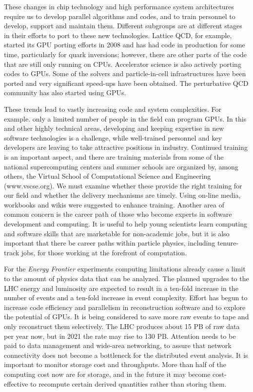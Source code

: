 These changes in chip technology and high performance system architectures
require us to develop parallel algorithms and codes, and to train personnel
to develop, support and maintain them. Different subgroups are at different
stages in their efforts to port to these new technologies. Lattice QCD, for
example, started its GPU porting efforts in 2008 and has had code in
production for some time, particularly for quark inversions; however, there
are other parts of the code that are still only running on CPUs.
Accelerator science is also actively porting codes to GPUs. Some of the
solvers and particle-in-cell infrastructures have been ported and very
significant speed-ups have been obtained. The perturbative QCD community
has also started using GPUs.

These trends lead to vastly increasing code and system complexities. For
example. only a limited number of people in the field can program GPUs. In
this and other highly technical areas, developing and keeping expertise in
new software technologies is a challenge, while well-trained personnel and
key developers are leaving to take attractive positions in industry.
Continued training is an important aspect, and there are training materials
from some of the national supercomputing centers and summer schools are
organized by, among others, the Virtual School of Computational Science and
Engineering (www.vscse.org). We must examine whether these provide the
right training for our field and whether the delivery mechanisms are
timely. Using on-line media, workbooks and wikis were suggested to enhance
training. Another area of common concern is the career path of those who
become experts in software development and computing. It is useful to help
young scientists learn computing and software skills that are marketable
for non-academic jobs, but it is also important that there be career paths
within particle physics, including tenure-track jobs, for those working at
the forefront of computation.

For the {\it Energy Frontier} experiments computing limitations already
cause a limit to the amount of physics data that can be analyzed. The
planned upgrades to the LHC energy and luminosity are expected to result in
a ten-fold increase in the number of events and a ten-fold increase in
event complexity. Effort has begun to increase code efficiency and
parallelism in reconstruction software and to explore the potential of
GPUs. It is being considered to save more raw events to tape and only
reconstruct them selectively. The LHC produces about 15 PB of raw data per
year now, but in 2021 the rate may rise to 130 PB. Attention needs to be
paid to data management and wide-area networking, to assure that network
connectivity does not become a bottleneck for the distributed event
analysis. It is important to monitor storage cost and throughputs. More
than half of the computing cost now are for storage, and in the future it
may become cost-effective to recompute certain derived quantities rather
than storing them.

